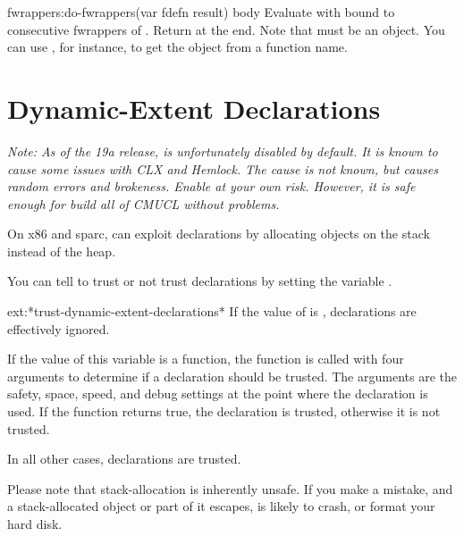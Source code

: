 \begin{defmac}{fwrappers:}{do-fwrappers}{(var fdefn \ampoptional
  result) \ampbody body}
  Evaluate  with  bound to consecutive fwrappers of
  .  Return  at the end.  Note that 
  must be an  object.  You can use
  , for instance, to get the 
  object from a function name.
\end{defmac}

\section{Dynamic-Extent Declarations}

\emph{Note:  As of the 19a release,  is
  unfortunately disabled by default.  It is known to cause some issues
  with CLX and Hemlock.  The cause is not known, but causes random
  errors and brokeness.  Enable at your own risk.  However, it is safe
  enough for build all of CMUCL without problems.}

On x86 and sparc, \cmucl{} can exploit 
declarations by allocating objects on the stack instead of the heap.

You can tell \cmucl{} to trust or not trust 
declarations by setting the variable
.

\begin{defvar}{ext:}{*trust-dynamic-extent-declarations*}
  If the value of  is 
  ,  declarations are effectively
  ignored.

  If the value of this variable is a function, the function is called
  with four arguments to determine if a  
  declaration should be trusted.  The arguments are the safety,
  space, speed, and debug settings at the point where the 
   declaration is used.  If the function
  returns true, the declaration is trusted, otherwise it is not
  trusted.

  In all other cases,  declarations are
  trusted.
\end{defvar}

Please note that stack-allocation is inherently unsafe.  If you make a
mistake, and a stack-allocated object or part of it escapes, \cmucl{}
is likely to crash, or format your hard disk.

